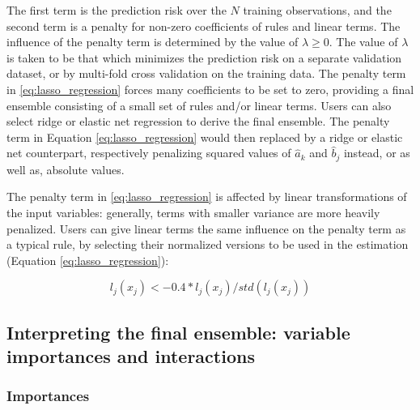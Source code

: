 \documentclass[nobf,doc]{apa}
\begin{document}
The first term is the prediction risk over the $N$ training observations, and the second term is a penalty for non-zero coefficients of rules and linear terms. The influence of the penalty term is determined by the value of $\lambda \geq 0$. The value of $\lambda$ is taken to be that which minimizes the prediction risk on a separate validation dataset, or by multi-fold cross validation on the training data. The penalty term in \ref{eq:lasso_regression} forces many coefficients to be set to zero, providing a final ensemble consisting of a small set of rules and/or linear terms. Users can also select ridge or elastic net regression \cite{ZouyHast05} to derive the final ensemble. The penalty term in Equation \ref{eq:lasso_regression} would then replaced by a ridge or elastic net counterpart, respectively penalizing squared values of $\hat{a}_k$ and $\hat{b}_j$ instead, or as well as, absolute values. 

The penalty term in \ref{eq:lasso_regression} is affected by linear transformations of the input variables: generally, terms with smaller variance are more heavily penalized. Users can give linear terms the same influence on the penalty term as a typical rule, by selecting their normalized versions to be used in the estimation (Equation \ref{eq:lasso_regression}):

\begin{equation} 
	l_j(x_j) <- 0.4*l_j(x_j) / \textit{std}(l_j(x_j))
\end{equation}




\subsection{Interpreting the final ensemble: variable importances and interactions}

\subsubsection{Importances}
\end{document}
